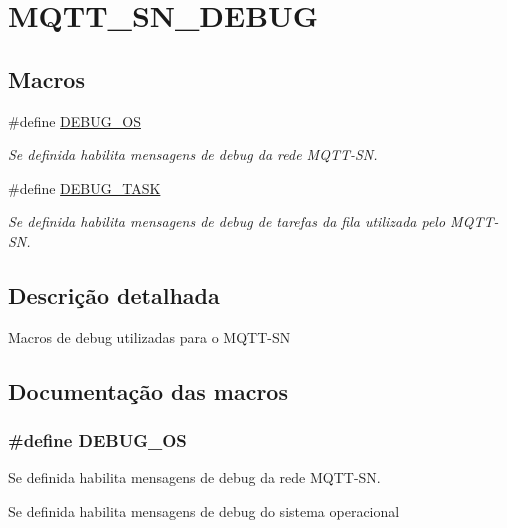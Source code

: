 \hypertarget{group__MQTT__SN__DEBUG}{\section{M\+Q\+T\+T\+\_\+\+S\+N\+\_\+\+D\+E\+B\+U\+G}
\label{group__MQTT__SN__DEBUG}
}
\subsection*{Macros}
\begin{DoxyCompactItemize}
\item 
\#define \hyperlink{group__MQTT__SN__DEBUG_ga7871b41b94f3b5aac9e79ad353903ae7}{D\+E\+B\+U\+G\+\_\+\+O\+S}
\begin{DoxyCompactList}\small\item\em Se definida habilita mensagens de debug da rede M\+Q\+T\+T-\/\+S\+N. \end{DoxyCompactList}\item 
\hypertarget{group__MQTT__SN__DEBUG_gac3a54f3a6ca71cb643dc99df536f503c}{\#define \hyperlink{group__MQTT__SN__DEBUG_gac3a54f3a6ca71cb643dc99df536f503c}{D\+E\+B\+U\+G\+\_\+\+T\+A\+S\+K}}\label{group__MQTT__SN__DEBUG_gac3a54f3a6ca71cb643dc99df536f503c}

\begin{DoxyCompactList}\small\item\em Se definida habilita mensagens de debug de tarefas da fila utilizada pelo M\+Q\+T\+T-\/\+S\+N. \end{DoxyCompactList}\end{DoxyCompactItemize}


\subsection{Descrição detalhada}
Macros de debug utilizadas para o M\+Q\+T\+T-\/\+S\+N 

\subsection{Documentação das macros}
\hypertarget{group__MQTT__SN__DEBUG_ga7871b41b94f3b5aac9e79ad353903ae7}{
\subsubsection[{D\+E\+B\+U\+G\+\_\+\+O\+S}]{\setlength{\rightskip}{0pt plus 5cm}\#define D\+E\+B\+U\+G\+\_\+\+O\+S}}\label{group__MQTT__SN__DEBUG_ga7871b41b94f3b5aac9e79ad353903ae7}


Se definida habilita mensagens de debug da rede M\+Q\+T\+T-\/\+S\+N. 

Se definida habilita mensagens de debug do sistema operacional 